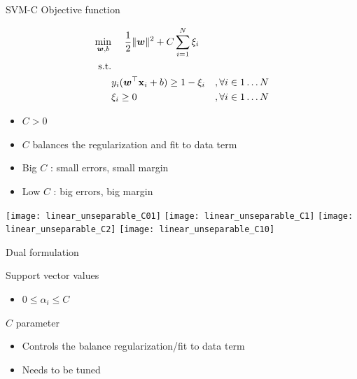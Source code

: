 \documentclass[11pt, pdf, compress, handout]{beamer}
\begin{document}
\begin{frame}{SVM-C Objective function}
  \large{
      \begin{center}
        \begin{align*}
          \min_{{\boldsymbol{w}},b}& ~~~~  \frac{1}{2} \| {\boldsymbol{w}} \|^2 + C \sum_{i=1}^N \xi_i \\
          \text{s.t.} & \\
          &  y_i({\boldsymbol{w}}^\top {\mathbf{x}}_i + b) \geq 1 - \xi_i& , \forall i \in 1 
            \dots N \\
          & \xi_i \geq 0 & ,\forall i \in 1 
            \dots N  
        \end{align*}
  
    \end{center}
  }
  \begin{itemize}
  \item $C > 0$
  \item $C$ balances the regularization and fit to data term
  \item Big $C$ : small errors, small margin
  \item Low $C$ : big errors, big margin
  \end{itemize}
\end{frame}
\begin{frame}[plain]
  \begin{centering}
    \texttt{[image: linear\_unseparable\_C01]}
    \texttt{[image: linear\_unseparable\_C1]}
    \texttt{[image: linear\_unseparable\_C2]}
    \texttt{[image: linear\_unseparable\_C10]}
  \end{centering}
\end{frame}
\begin{frame}[label={sec:orga38f76c}]{Dual formulation}
  \begin{block}{Support vector values}
    \begin{itemize}
    \item $0 \leq \alpha_i \leq C$
    \end{itemize}
  \end{block}
  \begin{block}{$C$ parameter}
    \begin{itemize}
    \item Controls the balance regularization/fit to data term
    \item Needs to be tuned
    \end{itemize}
  \end{block}
\end{frame}
\begin{frame}[plain]
  
\end{frame}
\end{document}
